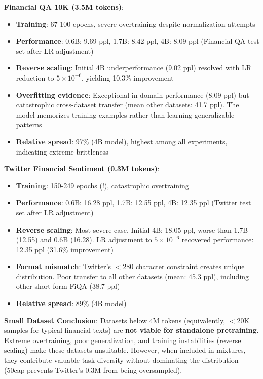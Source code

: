 \textbf{Financial QA 10K (3.5M tokens)}:
\begin{itemize}
\item \textbf{Training}: 67-100 epochs, severe overtraining despite normalization attempts
\item \textbf{Performance}: 0.6B: 9.69 ppl, 1.7B: 8.42 ppl, 4B: 8.09 ppl (Financial QA test set after LR adjustment)
\item \textbf{Reverse scaling}: Initial 4B underperformance (9.02 ppl) resolved with LR reduction to $5 \times 10^{-6}$, yielding 10.3\% improvement
\item \textbf{Overfitting evidence}: Exceptional in-domain performance (8.09 ppl) but catastrophic cross-dataset transfer (mean other datasets: 41.7 ppl). The model memorizes training examples rather than learning generalizable patterns
\item \textbf{Relative spread}: 97\% (4B model), highest among all experiments, indicating extreme brittleness
\end{itemize}

\textbf{Twitter Financial Sentiment (0.3M tokens)}:
\begin{itemize}
\item \textbf{Training}: 150-249 epochs (!), catastrophic overtraining
\item \textbf{Performance}: 0.6B: 16.28 ppl, 1.7B: 12.55 ppl, 4B: 12.35 ppl (Twitter test set after LR adjustment)
\item \textbf{Reverse scaling}: Most severe case. Initial 4B: 18.05 ppl, worse than 1.7B (12.55) and 0.6B (16.28). LR adjustment to $5 \times 10^{-6}$ recovered performance: 12.35 ppl (31.6\% improvement)
\item \textbf{Format mismatch}: Twitter's $<$280 character constraint creates unique distribution. Poor transfer to all other datasets (mean: 45.3 ppl), including other short-form FiQA (38.7 ppl)
\item \textbf{Relative spread}: 89\% (4B model)
\end{itemize}

\textbf{Small Dataset Conclusion}: Datasets below 4M tokens (equivalently, $<$20K samples for typical financial texts) are \textbf{not viable for standalone pretraining}. Extreme overtraining, poor generalization, and training instabilities (reverse scaling) make these datasets unsuitable. However, when included in mixtures, they contribute valuable task diversity without dominating the distribution (50cap prevents Twitter's 0.3M from being oversampled).

